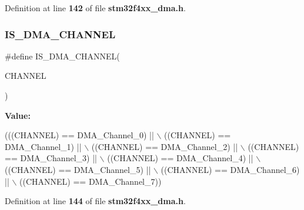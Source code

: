 Definition at line \textbf{ 142} of file \textbf{ stm32f4xx\+\_\+dma.\+h}.

\mbox{\label{group__DMA__channel_gac7f4709d9244f25b853789d888a74d46}} 
\subsubsection{I\+S\+\_\+\+D\+M\+A\+\_\+\+C\+H\+A\+N\+N\+EL}
{\footnotesize\ttfamily \#define I\+S\+\_\+\+D\+M\+A\+\_\+\+C\+H\+A\+N\+N\+EL(\begin{DoxyParamCaption}\item[{}]{C\+H\+A\+N\+N\+EL }\end{DoxyParamCaption})}

{\bfseries Value\+:}
\begin{DoxyCode}
(((CHANNEL) == DMA_Channel_0) || \(\backslash\)
                                 ((CHANNEL) == DMA_Channel_1) || \(\backslash\)
                                 ((CHANNEL) == DMA_Channel_2) || \(\backslash\)
                                 ((CHANNEL) == DMA_Channel_3) || \(\backslash\)
                                 ((CHANNEL) == DMA_Channel_4) || \(\backslash\)
                                 ((CHANNEL) == DMA_Channel_5) || \(\backslash\)
                                 ((CHANNEL) == DMA_Channel_6) || \(\backslash\)
                                 ((CHANNEL) == DMA_Channel_7))
\end{DoxyCode}


Definition at line \textbf{ 144} of file \textbf{ stm32f4xx\+\_\+dma.\+h}.

